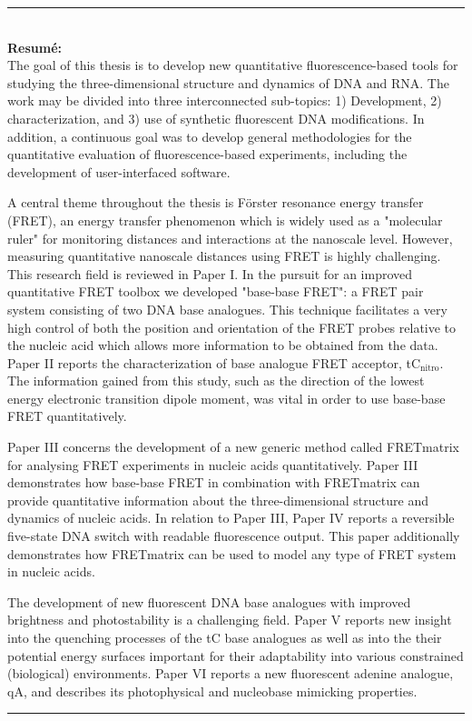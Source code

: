 \cleardoublepage
{} %
\begin{vcentrepage}
\noindent\rule[2pt]{\textwidth}{0.2pt}\\

{\large\textbf{Resumé:}\\}
The goal of this thesis is to develop new quantitative fluorescence-based tools for studying the three-dimensional structure and dynamics of DNA and RNA. The work may be divided into three interconnected sub-topics: 1) Development, 2) characterization, and 3) use of synthetic fluorescent DNA modifications. In addition, a continuous goal was to develop general methodologies for the quantitative evaluation of fluorescence-based experiments, including the development of user-interfaced software.

A central theme throughout the thesis is Förster resonance energy transfer (FRET), an energy transfer phenomenon which is widely used as a "molecular ruler" for monitoring distances and interactions at the nanoscale level. However, measuring quantitative nanoscale distances using FRET is highly challenging. This research field is reviewed in Paper I. In the pursuit for an improved quantitative FRET toolbox we developed "base-base FRET": a FRET pair system consisting of two DNA base analogues. This technique facilitates a very high control of both the position and orientation of the FRET probes relative to the nucleic acid which allows more information to be obtained from the data. Paper II reports the characterization of base analogue FRET acceptor, tC$_\mathrm{nitro}$. The information gained from this study, such as the direction of the lowest energy electronic transition dipole moment, was vital in order to use base-base FRET quantitatively.

Paper III concerns the development of a new generic method called FRETmatrix for analysing FRET experiments in nucleic acids quantitatively. Paper III demonstrates how base-base FRET in combination with FRETmatrix can provide quantitative information about the three-dimensional structure and dynamics of nucleic acids. In relation to Paper III, Paper IV reports a reversible five-state DNA switch with readable fluorescence output. This paper additionally demonstrates how FRETmatrix can be used to model any type of FRET system in nucleic acids.

The development of new fluorescent DNA base analogues with improved brightness and photostability is a challenging field. Paper V reports new insight into the quenching processes of the tC base analogues as well as into the their potential energy surfaces important for their adaptability into various constrained (biological) environments. Paper VI reports a new fluorescent adenine analogue, qA, and describes its photophysical and nucleobase mimicking properties.



\noindent\rule[2pt]{\textwidth}{0.8pt}
\end{vcentrepage}



\restoregeometry

